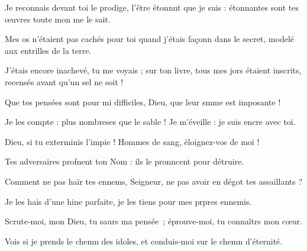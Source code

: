 \item Je reconnais devant toi le prodige, l’être étonnnt que je suis :\psstar{} étonnantes sont tes œuvres toute mon me le sait.
\item Mes os n’étaient pas cachés pour toi\pscross{} quand j’étais façonn dans le secret,\psstar{} modelé aux entrilles de la terre.
\item J’étais encore inachevé, tu me voyais ;\pscross{} sur ton livre, tous mes jors étaient inscrits,\psstar{} recensés avant qu’un sel ne soit !
\item Que tes pensées sont pour mi difficiles,\psstar{} Dieu, que leur smme est imposante !
\item Je les compte : plus nombreses que le sable !\psstar{} Je m’éveille : je suis encre avec toi.
\item Dieu, si tu exterminis l’impie !\psstar{} Hommes de sang, éloignez-vos de moi !
\item Tes adversaires profnent ton Nom :\psstar{} ils le pronncent pour détruire.
\item Comment ne pas haïr tes ennems, Seigneur,\psstar{} ne pas avoir en dégot tes assaillants ?
\item Je les hais d’une hine parfaite,\psstar{} je les tiens pour mes prpres ennemis.
\item Scrute-moi, mon Dieu, tu saurs ma pensée ;\psstar{} éprouve-moi, tu connaîtrs mon cœur.
\item Vois si je prends le chemn des idoles,\psstar{} et conduis-moi sur le chemn d’éternité.